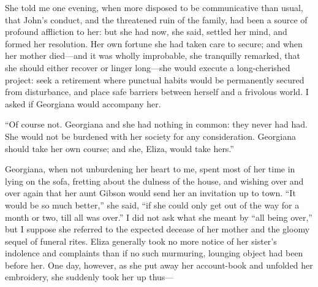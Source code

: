 She told me one evening, when more disposed to be communicative than
usual, that John's conduct, and the threatened ruin of the family, had
been a source of profound affliction to her: but she had now, she said,
settled her mind, and formed her resolution. Her own fortune she had
taken care to secure; and when her mother died---and it was wholly
improbable, she tranquilly remarked, that she should either recover or
linger long---she would execute a long-cherished project: seek a
retirement where punctual habits would be permanently secured from
disturbance, and place safe barriers between herself and a frivolous
world. I asked if Georgiana would accompany her.

\enquote{Of course not. Georgiana and she had nothing in common: they
never had had. She would not be burdened with her society for any
consideration. Georgiana should take her own course; and she, Eliza,
would take hers.}

Georgiana, when not unburdening her heart to me, spent most of her time
in lying on the sofa, fretting about the dulness of the house, and
wishing over and over again that her aunt Gibson would send her an
invitation up to town. \enquote{It would be so much better,} she said,
\enquote{if she could only get out of the way for a month or two, till
all was over.} I did not ask what she meant by \enquote{all being
over,} but I suppose she referred to the expected decease of her mother
and the gloomy sequel of funeral rites. Eliza generally took no more
notice of her sister's indolence and complaints than if no such
murmuring, lounging object had been before her. One day, however, as
she put away her account-book and unfolded her embroidery, she suddenly
took her up thus---

